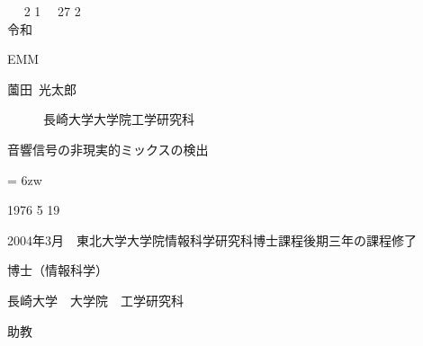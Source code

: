 \documentclass[a4paper,uplatex,12pt]{jsarticle}
\begin{document}
	\vspace*{-1.6zh}
	\hspace{-5zw}\sout{\phantom{平成}}~~ 2 \phantom{年~} 1　\phantom{月~} 27 \phantom{日~~~~} 2\\[-1.5zh]
	\hspace{-4zw}令和\vspace{-1zh}
    
    \begin{minipage}[t]{0.4\textwidth}
    \vspace*{0.1zh}\hspace*{-5zw}
    EMM
    \end{minipage}
    \begin{minipage}[t]{0.6\textwidth}
    \begin{description}
    	\item[薗田~光太郎] 長崎大学大学院工学研究科
    	\item[\phantom{姓名}] \phantom{所属}
    	\item[\phantom{姓名}] \phantom{所属}
    	\item[\phantom{姓名}] \phantom{所属}
    \end{description}	
    \end{minipage}
    
    \vspace{5zh}
    音響信号の非現実的ミックスの検出
    
    \vspace{1.5zh}
    \parindent = 6zw
    	
    
    \hspace{1.2zw} 1976\hspace{3.3zw} 5\hspace{3.3zw} 19\hspace{6zw} \sout{\phantom{学生}}~\Ovalbox{\phantom{一般}}
    
    2004年3月　東北大学大学院情報科学研究科博士課程後期三年の課程修了
    
    博士（情報科学）
    
    長崎大学　大学院　工学研究科
    
    助教
    
    \phantom{表彰}
    
    \phantom{主な著書}
    
    \phantom{研究歴}
    		
\end{document}
